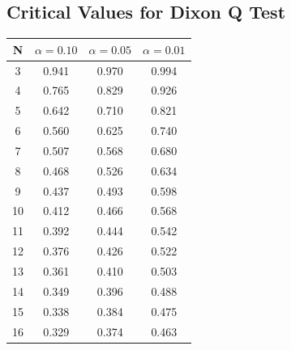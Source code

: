 \documentclass[a4paper,12pt]{article}
\begin{document}
\subsection*{Critical Values for Dixon Q Test}
{
	\Large
	\begin{center}
		\begin{tabular}{|c|c|c|c|}
			\hline  N  & $\alpha=0.10$  & $\alpha=0.05$  & $\alpha=0.01$  \\ \hline
			3  & 0.941 & 0.970 & 0.994 \\ \hline
			4  & 0.765 & 0.829 & 0.926 \\ \hline
			5  & 0.642 & 0.710  & 0.821 \\ \hline
			6  & 0.560 & 0.625 & 0.740 \\ \hline
			7  & 0.507 & 0.568 & 0.680  \\ \hline
			8  & 0.468 & 0.526 & 0.634 \\ \hline
			9  & 0.437 & 0.493 & 0.598 \\ \hline
			10 & 0.412 & 0.466 & 0.568 \\ \hline
			11 & 0.392 & 0.444 & 0.542 \\ \hline
			12 & 0.376 & 0.426 & 0.522 \\ \hline
			13 & 0.361 & 0.410 & 0.503 \\ \hline
			14 & 0.349 & 0.396 & 0.488 \\ \hline
			15 & 0.338 & 0.384 & 0.475 \\ \hline
			16 & 0.329 & 0.374 & 0.463 \\ \hline
		\end{tabular} 
	\end{center}
}
\end{document}
